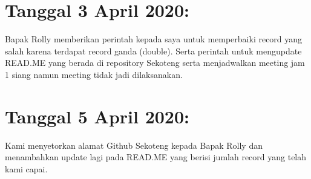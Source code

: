 \documentclass{article}
\begin{document}
\section{Tanggal 3 April 2020:}
Bapak Rolly memberikan perintah kepada saya untuk memperbaiki record yang salah karena terdapat record ganda (double). Serta perintah untuk mengupdate READ.ME yang berada di repository Sekoteng serta menjadwalkan meeting jam 1 siang namun meeting tidak jadi dilaksanakan.
\newline
\newline

\section{Tanggal 5 April 2020:}
Kami menyetorkan alamat Github Sekoteng kepada Bapak Rolly dan menambahkan update lagi pada READ.ME yang berisi jumlah record yang telah kami capai.
\newline
\newline
\end{document}

